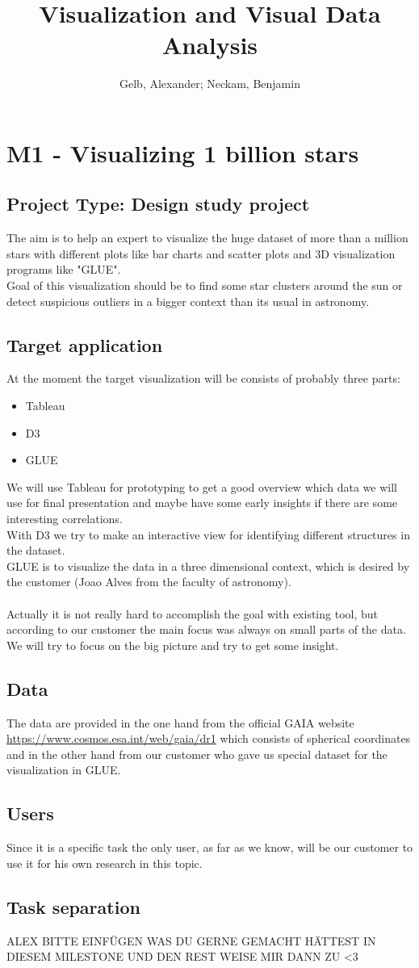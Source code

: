 \documentclass{article}
\begin{document}
\title{Visualization and Visual Data Analysis}
\author{Gelb, Alexander; Neckam, Benjamin}
\maketitle
\section{M1 - Visualizing 1 billion stars}
\subsection{Project Type: Design study project}
The aim is to help  an expert to visualize  the huge dataset of  more than a million stars with different plots like bar charts and scatter plots and 3D visualization programs like "GLUE".\\
Goal of this visualization should be to find some star clusters around the sun or detect suspicious outliers in a bigger context than its usual in astronomy.\\
\subsection{Target application}
At the moment the target visualization will be consists of probably three parts:
\begin{itemize}
\item Tableau
\item D3
\item GLUE\\
\end{itemize}
We will use Tableau for prototyping to get a good overview which data we will use for final presentation and maybe have some early insights if there are some interesting correlations.\\
With D3 we try to make an interactive view for identifying different structures in the dataset.\\
GLUE is to visualize the data in a three dimensional context, which is desired by the customer (Joao Alves from the faculty of astronomy).\\
\\
Actually it is not really hard to accomplish the goal with existing tool, but according to our customer the main focus was always on small parts of the data. We will try to focus on the big picture and try to get some insight.\\
\subsection{Data}
The data are provided in the one hand from the official GAIA website \url{https://www.cosmos.esa.int/web/gaia/dr1} which consists of spherical coordinates and in the other hand from our customer who gave us special dataset for the visualization in GLUE.
\subsection{Users}
Since it is a specific task the only user, as far as we know, will be our customer to use it for his own research in this topic.
\subsection{Task separation}
ALEX BITTE EINFÜGEN WAS DU GERNE GEMACHT HÄTTEST IN DIESEM MILESTONE UND DEN REST WEISE MIR DANN ZU <3
\end{document}
